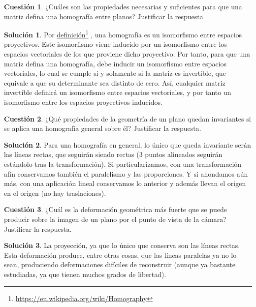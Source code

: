 \documentclass[a4paper, 11pt]{article}
\newcommand\fnurl[2]{%
  \href{#2}{#1}\footnote{\url{#2}}%
}
\theoremstyle{definition}
\newtheorem{cuestion}{Cuestión}
\newtheorem*{solucion}{Solución}
\begin{document}
  \begin{cuestion}
    ¿Cuáles son las propiedades necesarias y suficientes para que una matriz
    defina una homografía entre planos? Justificar la respuesta
  \end{cuestion}

  \begin{solucion}
      Por \fnurl{definición}{https://en.wikipedia.org/wiki/Homography}, una homografía
      es un isomorfismo entre espacios proyectivos. Este isomorfismo viene inducido
      por un isomorfismo entre los espacios vectoriales de los que proviene dicho proyectivo.
      Por tanto, para que una matriz defina una homografía, debe inducir un isomorfismo
      entre espacios vectoriales, lo cual se cumple si y solamente si la matriz es invertible,
      que equivale a que su determinante sea distinto de cero. Así, cualquier matriz invertible
      definirá un isomorfismo entre espacios vectoriales, y por tanto un isomorfismo entre
      los espacios proyectivos inducidos.
  \end{solucion}

  \begin{cuestion}
    ¿Qué propiedades de la geometría de un plano quedan invariantes si se aplica
    una homografía general sobre él? Justificar la respuesta.
  \end{cuestion}

  \begin{solucion}
    Para una homografía en general, lo único que queda invariante serán las líneas
    rectas, que seguirán siendo rectas (3 puntos alineados seguirán estándolo tras la transformación).
    Si particularizamos, con una transformación afín conservamos también el paralelismo y las proporciones. Y si ahondamos aún más, con
    una aplicación lineal conservamos lo anterior y además llevan el origen en el origen
    (no hay traslaciones).
  \end{solucion}

  \begin{cuestion}
    ¿Cuál es la deformación geométrica más fuerte que se puede producir sobre
    la imagen de un plano por el punto de vista de la cámara? Justificar la respuesta.
  \end{cuestion}

  \begin{solucion}
    La proyección, ya que lo único que conserva son las líneas rectas. Esta deformación
    produce, entre otras cosas, que las líneas paralelas ya no lo sean, produciendo
    deformaciones difíciles de reconstruir (aunque ya bastante estudiadas, ya que tienen muchos
    grados de libertad).
  \end{solucion}
\end{document}
